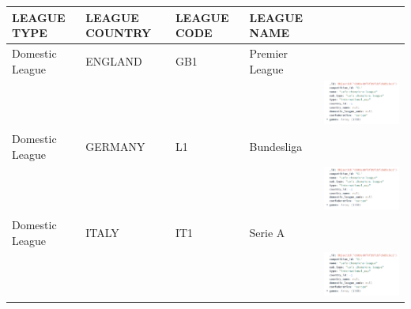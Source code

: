 \documentclass{Configuration_Files/PoliMi3i_thesis}
\begin{document}
    \begin{tabular}{|p{3cm}|p{2cm}|p{2cm}|p{2cm}|p{6cm}|}
        \hline
        \rowcolor{bluepoli!40}
        \textbf{LEAGUE TYPE}          & \textbf{LEAGUE COUNTRY} & \textbf{LEAGUE CODE} & \textbf{LEAGUE NAME} & \\ \hline
    Domestic League                & ENGLAND                & GB1                  & Premier League     & \\
    & & & &\includegraphics[scale=0.7]{Images/Leagues analysed/CL.png}  \\ \hline
    Domestic League                & GERMANY                & L1                   & Bundesliga         & \\
    & & & &\includegraphics[scale=0.7]{Images/Leagues analysed/CL.png}  \\ \hline
    Domestic League                & ITALY                  & IT1                  & Serie A            & \\
    & & & &\includegraphics[scale=0.7]{Images/Leagues analysed/CL.png}  \\ \hline
\end{tabular}
\end{document}
